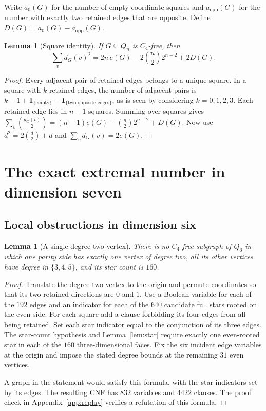 \documentclass[11pt,reqno]{amsart}
\numberwithin{equation}{section}
\newtheorem{lemma}[theorem]{Lemma}
\newcommand{\one}{\mathbf{1}}
\begin{document}
Write \(a_0(G)\) for the number of empty coordinate squares and
\(a_{\mathrm{opp}}(G)\) for the number with exactly two retained edges
that are opposite. Define \(D(G)=a_0(G)-a_{\mathrm{opp}}(G)\).

\begin{lemma}[Square identity]\label{lem:square}
If \(G\subseteq Q_n\) is \(C_4\)-free, then
\begin{equation}\label{eq:square}
  \sum_{v}d_G(v)^2
    =2n\,e(G)-2\binom n2 2^{n-2}+2D(G).
\end{equation}
\end{lemma}

\begin{proof}
Every adjacent pair of retained edges belongs to a unique square. In a
square with \(k\) retained edges, the number of adjacent pairs is
\(k-1+\one_{\{\text{empty}\}}-\one_{\{\text{two opposite edges}\}}\),
as is seen by considering \(k=0,1,2,3\). Each retained edge lies in
\(n-1\) squares. Summing over squares gives
\(\sum_v\binom{d_G(v)}2=(n-1)e(G)-\binom n2 2^{n-2}+D(G)\).
Now use \(d^2=2\binom d2+d\) and \(\sum_v d_G(v)=2e(G)\).
\end{proof}

\section{The exact extremal number in dimension seven}\label{sec:q7}

\subsection{Local obstructions in dimension six}

\begin{lemma}[A single degree-two vertex]\label{lem:root}
There is no \(C_4\)-free subgraph of \(Q_6\) in which one parity side
has exactly one vertex of degree two, all its other vertices have
degree in \(\{3,4,5\}\), and its star count is \(160\).
\end{lemma}

\begin{proof}
Translate the degree-two vertex to the origin and permute coordinates
so that its two retained directions are \(0\) and \(1\). Use a Boolean
variable for each of the \(192\) edges and an indicator for each of
the \(640\) candidate full stars rooted on the even side. For each
square add a clause forbidding its four edges from all being retained.
Set each star indicator equal to the conjunction of its three edges.
The star-count hypothesis and Lemma~\ref{lem:star} require exactly
one even-rooted star in each of the \(160\) three-dimensional faces.
Fix the six incident edge variables at the origin and impose the
stated degree bounds at the remaining \(31\) even vertices.

A graph in the statement would satisfy this formula, with the star
indicators set by its edges. The resulting CNF has \(832\) variables
and \(4422\) clauses. The proof check in
Appendix~\ref{app:replay} verifies a refutation of this formula.
\end{proof}
\end{document}
